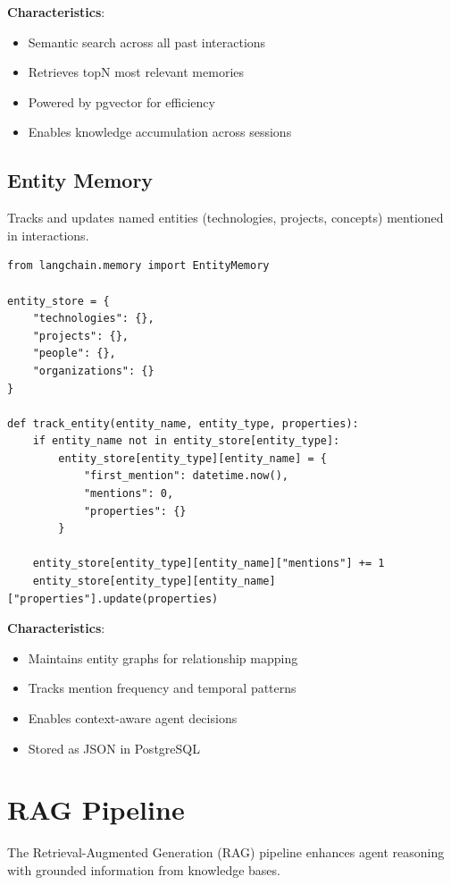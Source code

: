 \documentclass{report}
\begin{document}
\textbf{Characteristics}:
\begin{itemize}
    \item Semantic search across all past interactions
    \item Retrieves topN most relevant memories
    \item Powered by pgvector for efficiency
    \item Enables knowledge accumulation across sessions
\end{itemize}

\section{Entity Memory}

Tracks and updates named entities (technologies, projects, concepts) mentioned in interactions.

\begin{lstlisting}
from langchain.memory import EntityMemory

entity_store = {
    "technologies": {},
    "projects": {},
    "people": {},
    "organizations": {}
}

def track_entity(entity_name, entity_type, properties):
    if entity_name not in entity_store[entity_type]:
        entity_store[entity_type][entity_name] = {
            "first_mention": datetime.now(),
            "mentions": 0,
            "properties": {}
        }
    
    entity_store[entity_type][entity_name]["mentions"] += 1
    entity_store[entity_type][entity_name]["properties"].update(properties)
\end{lstlisting}

\textbf{Characteristics}:
\begin{itemize}
    \item Maintains entity graphs for relationship mapping
    \item Tracks mention frequency and temporal patterns
    \item Enables context-aware agent decisions
    \item Stored as JSON in PostgreSQL
\end{itemize}

\chapter{RAG Pipeline}

The Retrieval-Augmented Generation (RAG) pipeline enhances agent reasoning with grounded information from knowledge bases.
\end{document}
